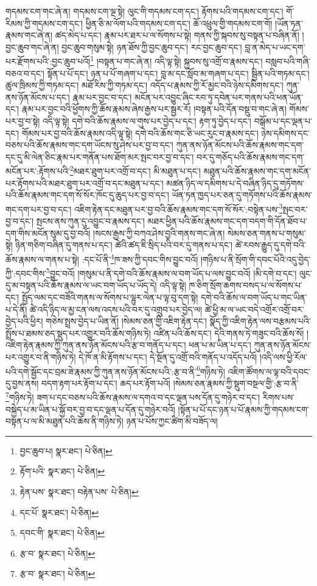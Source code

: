 གདམས་ངག་གང་ཞེ་ན། གདམས་ངག་ལྔ་སྟེ། ལུང་གི་གདམས་ངག་དང་། རྟོགས་པའི་གདམས་ངག་དང་། གོ་རིམས་ཀྱི་གདམས་ངག་དང་། ཕྱིན་ཅི་མ་ལོག་པའི་གདམས་ངག་དང་། ཆོ་འཕྲུལ་གྱི་གདམས་ངག་གོ། །ཡོན་ཏན་རྣམས་གང་ཞེ་ན། ཚད་མེད་པ་དང་། རྣམ་པར་ཐར་པ་ལ་སོགས་པ་སྟེ། གནས་ཀྱི་སྐབས་སུ་བསྟན་པ་བཞིན་ནོ། །བྱང་ཆུབ་གང་ཞེ་ན། བྱང་ཆུབ་གསུམ་སྟེ། ཉན་ཐོས་ཀྱི་བྱང་ཆུབ་དང་། རང་བྱང་ཆུབ་དང་། བླ་ན་མེད་པ་ཡང་དག་པར་རྫོགས་པའི་:བྱང་ཆུབ་པའོ།\footnote{བྱང་ཆུབ་པ།  སྣར་ཐང་།  པེ་ཅིན། } །བསྟན་པ་གང་ཞེ་ན། འདི་ལྟ་སྟེ། སྐྱབས་སུ་འགྲོ་བ་རྣམས་དང་། བསླབ་པའི་གཞི་བཅའ་བ་དང་། སྟོན་པ་པོ་དང་། ཉན་པ་པོ་གཞག་པ་དང་། བླ་མ་དང་སློབ་མ་གཞག་པ་དང་། སྦྱིན་པའི་གཏམ་དང་། ཚུལ་ཁྲིམས་ཀྱི་གཏམ་དང་། མཐོ་རིས་ཀྱི་གཏམ་དང་། འདོད་པ་རྣམས་ཀྱི་རོ་མྱང་བའི་ཉེས་དམིགས་དང་། ཀུན་ནས་ཉོན་མོངས་པ་དང་། རྣམ་པར་བྱང་བ་དང་། མངོན་པར་འབྱུང་ཞིང་རབ་ཏུ་དབེན་པར་གནས་པའི་ཕན་ཡོན་དང་། རྣམ་པར་བྱང་བའི་ཕྱོགས་ཀྱི་ཆོས་རྣམས་ཞེས་རྒྱས་པར་སྦྱར་རོ། །བསྟན་པའི་དོན་བསྡུ་བ་གང་ཞེ་ན། གོམས་པར་བྱ་བ་སྟེ། འདི་ལྟ་སྟེ། དགེ་བའི་ཆོས་རྣམས་ལ་གུས་པར་བྱེད་པ་དང་། རྟག་ཏུ་བྱེད་པ་དང་། བསྒོམ་པ་དང་ལྡན་པ་དང་། གོམས་པར་བྱ་བའི་ཆོས་རྣམས་འདི་ལྟ་སྟེ། དགེ་བའི་ཆོས་གང་ཅི་ཡང་རུང་བ་རྣམས་དང་། ཉེས་དམིགས་དང་བཅས་པའི་ཆོས་རྣམས་གང་དག་ཡོངས་སུ་ཤེས་པར་བྱ་བ་དང་། ཀུན་ནས་ཉོན་མོངས་པའི་ཆོས་རྣམས་གང་དག་དང་དུ་མི་ལེན་ཅིང་རྣམ་པར་གནོན་པས་ཐོག་མར་སྤང་བར་བྱ་བ་དང་། བར་དུ་གཅོད་པའི་ཆོས་རྣམས་གང་དག་མངོན་པར་:རྟོགས་པའི་\footnote{རྟོག་པའི་  སྣར་ཐང་།  པེ་ཅིན། }མཐར་ཐུག་པར་འགྲོ་བ་དང་། མི་མཐུན་པ་དང་། མཐུན་པའི་ཆོས་རྣམས་གང་དག་མངོན་པར་རྟོགས་པའི་མཐར་ཐུག་པར་འགྲོ་བ་དང་མཐུན་པ་དང་། མཚན་ཉིད་ལ་དམིགས་པ་དེ་བཞིན་ཉིད་དུ་གཏོགས་པའི་ཆོས་རྣམས་གང་དག་སོ་སོར་ཁོང་དུ་ཆུད་པར་བྱ་བ་དང་། ཡོན་ཏན་ཁྱད་པར་ཅན་དུ་གཏོགས་པའི་ཆོས་རྣམས་གང་དག་པར་བྱ་བ་དང་། འཇིག་རྟེན་དང་མཐུན་པར་བྱ་བའི་ཆོས་རྣམས་གང་དག་སོ་སོར་:བསྟེན་པས་\footnote{རྟེན་པས་  སྣར་ཐང་། བརྟེན་པས་  པེ་ཅིན། }སྤང་བར་བྱ་བ་དང་། སྤངས་ནས་ཀུན་དུ་འབྱུང་བ་རྣམས་དང་། མཐར་ཕྱིན་པའི་ཆོས་རྣམས་གང་དག་བདག་གི་དོན་ཐོབ་པ་དག་གིས་མངོན་སུམ་དུ་བྱ་བའོ། །སངས་རྒྱས་ཀྱི་བཀའ་ཤེས་བྱའི་གནས་གང་ཞེ་ན། སེམས་ཅན་གནས་པ་གསུམ་སྟེ། ཉིན་གཅིག་བཞིན་དུ་གནས་པ་དང་། ཚེའི་ཚད་ཇི་སྲིད་པའི་བར་དུ་གནས་པ་དང་། ཚེ་རབས་རྒྱུད་དུ་དགེ་བའི་ཆོས་རྣམས་ལ་གནས་པ་སྟེ། :དང་པོ་ནི་\footnote{དང་པོ་  སྣར་ཐང་།  པེ་ཅིན། }ཁ་ཟས་ཀྱི་དབང་གིས་བྱུང་བའོ། །གཉིས་པ་ནི་སྲོག་གི་དབང་པོའི་འདུ་བྱེད་ཀྱི་:དབང་གིས་\footnote{དབང་གི་  སྣར་ཐང་།  པེ་ཅིན། }བྱུང་བའོ། །གསུམ་པ་ནི་དགེ་བའི་ཆོས་རྣམས་ལ་བག་ཡོད་པ་ལས་བྱུང་བའོ། །མི་དགེ་བ་དང་། ལུང་དུ་མ་བསྟན་པའི་ཆོས་རྣམས་ལ་ཡང་བག་ཡོད་པ་ཡོད་དེ། འདི་ལྟ་སྟེ། ཁ་ཅིག་སྲོག་ཆགས་བསད་པ་ལ་སོགས་པ་དང་། སྤྱོད་ལམ་དང་བཟོའི་གནས་ལ་སོགས་པ་ལྷུར་ལེན་པ་ལྟ་བུ་དག་སྟེ། དགེ་བའི་ཆོས་ལ་བག་ཡོད་པ་གང་ཡིན་པ་དེ་ནི། ཚེ་འདི་ཉིད་ལ་མྱ་ངན་ལས་འདས་པའི་བར་དུ་འགྲུབ་པར་བྱེད་ལ། ཚེ་ཕྱི་མ་ལ་ཡང་བདེ་འགྲོར་འགྲོ་བར་བྱེད་པའི་ཕྱིར། གཅེས་སྤྲས་བྱེད་པ་ཡིན་ནོ། །སེམས་ཅན་གྱི་འཇིག་རྟེན་དང་། སྣོད་ཀྱི་འཇིག་རྟེན་ལས་བརྩམས་པའི་སྤྲོས་པ་ཐམས་ཅད་སྡུད་པར་འགྱུར་བའི་ཆོས་གཉིས་ཏེ། འཛིན་པའི་ཆོས་དང་། དེའི་གནས་ཏེ་གཟུང་བའི་ཆོས་སོ། །འཇིག་རྟེན་རྣམས་ཀྱི་ཀུན་ནས་ཉོན་མོངས་པའི་རྩ་བ་གནོད་པ་དང་། ཕན་པ་མ་ཡིན་པ་དང་། ཀུན་ནས་ཉོན་མོངས་པར་འགྱུར་བ་ནི་གཉིས་ཏེ། དེ་ཁོ་ན་མི་རྟོགས་པ་དང་། དེ་སྔོན་དུ་འགྲོ་བའི་གནོད་པ་འདོད་པའོ། །འདི་ལས་ཕྱི་རོལ་པའི་དགེ་སྦྱོང་དང་བྲམ་ཟེ་རྣམས་ཀྱི་ཀུན་ནས་ཉོན་མོངས་པའི་:རྩ་བ་ནི་\footnote{རྩ་བ་  སྣར་ཐང་།  པེ་ཅིན། }གཉིས་ཏེ། འཇིག་ཚོགས་ལ་ལྟ་བའི་དབང་དུ་བྱས་ནས། བདག་རྟག་པར་རྟོག་པ་དང་། ཆད་པར་རྟོག་པའོ། །སེམས་ཅན་རྣམས་ཀྱི་སྡུག་བསྔལ་གྱི་:རྩ་བ་ནི་\footnote{རྩ་བ་  སྣར་ཐང་།  པེ་ཅིན། }གཉིས་ཏེ། ཟག་པ་དང་བཅས་པའི་ཆོས་རྣམས་ལ་དགའ་བ་དང་ལྡན་པས་དོན་དུ་གཉེར་བ་དང་། རིགས་པས་བསྐྱེད་པ་མ་ཡིན་པ་སྐྱོ་བར་བྱ་བ་དང་ལྡན་པ་དོན་དུ་གཉེར་བའོ། །སྟོན་པ་པོ་དང་ཉན་པ་པོ་རྣམས་ཀྱི་གདམས་ངག་བསྟན་པ་ལ་མི་མཐུན་པའི་ཆོས་ནི་གཉིས་ཏེ། ཉན་པ་པོས་ཀྱང་ཚིག་མི་བཟོད་ལ། 